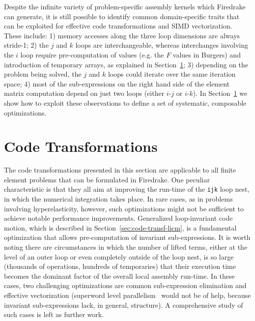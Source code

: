 \documentclass[conference]{IEEEtran}
\begin{document}
Despite the infinite variety of problem-specific assembly kernels which Firedrake can generate, it is still possible to identify common domain-specific traits that can be exploited for effective code transformations and SIMD vectorization. These include: 1) memory accesses along the three loop dimensions are always stride-1; 2) the $j$ and $k$ loops are interchangeable, whereas interchanges involving the $i$ loop require pre-computation of values (e.g. the $F$ values in Burgers) and introduction of temporary arrays, as explained in Section~\ref{sec:code-transf}; 3) depending on the problem being solved, the $j$ and $k$ loops could iterate over the same iteration space; 4) most of the sub-expressions on the right hand side of the element matrix computation depend on just two loops (either $i$-$j$ or $i$-$k$). In Section~\ref{sec:code-transf} we show how to exploit these observations to define a set of systematic, composable optimizations.


\section{Code Transformations}
\label{sec:code-transf}
The code transformations presented in this section are applicable to all finite element problems that can be formulated in Firedrake. One peculiar characteristic is that they all aim at improving the run-time of the \texttt{ijk} loop nest, in which the numerical integration takes place. In rare cases, as in problems involving hyperelasticity, however, such optimizations might not be sufficient to achieve notable performance improvements. Generalized loop-invariant code motion, which is described in Section~\ref{sec:code-transf-licm}, is a fundamental optimization that allows pre-computation of invariant sub-expressions. It is worth noting there are circumstances in which the number of lifted terms, either at the level of an outer loop or even completely outside of the loop nest, is so large (thousands of operations, hundreds of temporaries) that their execution time becomes the dominant factor of the overall local assembly run-time. In these cases, two challenging optimizations are common sub-expression elimination and effective vectorization (superword level parallelism~\cite{SLP} would not be of help, because invariant sub-expressions lack, in general, structure). A comprehensive study of such cases is left as further work.
\end{document}
